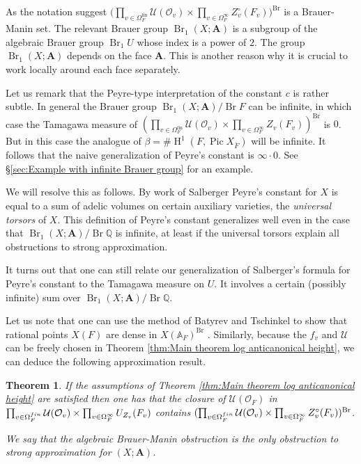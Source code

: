 \documentclass[a4paper,11pt,reqno]{amsart}
\newcommand{\Q}{\mathbb{Q}}
\newcommand{\A}{\mathbb{A}}
\DeclareMathOperator{\Pic}{Pic}
\DeclareMathOperator{\Br}{Br}
\DeclareMathOperator{\HH}{H}
\newtheorem{theorem}{Theorem}[section]
\theoremstyle{definition}
\begin{document}
As the notation suggest $\big(\prod_{v \in \Omega_F^{\text{fin}}} \mathcal{U}(\mathcal{O}_v) \times \prod_{v \in \Omega_F^{\infty}} Z_v^{\circ}(F_v)\big)^{\Br}$ is a Brauer-Manin set. The relevant Brauer group $\Br_1 (X ; \mathbf{A})$ is a subgroup of the algebraic Brauer group $\Br_1 U$ whose index is a power of $2$. The group $\Br_1 (X ; \mathbf{A})$ depends on the face $\mathbf{A}$. This is another reason why it is crucial to work locally around each face separately. 

Let us remark that the Peyre-type interpretation of the constant $c$ is rather subtle. In general the Brauer group $\Br_1 (X ; \mathbf{A})/ \Br F$ can be infinite, in which case the Tamagawa measure of $(\prod_{v \in \Omega_F^{\text{fin}}} \mathcal{U}(\mathcal{O}_v) \times \prod_{v \in \Omega_F^{\infty}} Z_v(F_v))^{\Br}$ is $0$. But in this case the analogue of $\beta = \# \HH^1(F, \Pic X_{\overline{F}})$ will be infinite. It follows that the naive generalization of Peyre's constant is $\infty \cdot 0$. See \S\ref{sec:Example with infinite Brauer group} for an example.

We will resolve this as follows. By work of Salberger \cite[Assertion~5.25]{Salberger1998Tamagawa} Peyre's constant for $X$ is equal to a sum of adelic volumes on certain auxiliary varieties, the \emph{universal torsors} of $X$. This definition of Peyre's constant generalizes well even in the case that $\Br_1 (X ; \mathbf{A})/\Br \Q$ is infinite, at least if the universal torsors explain all obstructions to strong approximation.

It turns out that one can still relate our generalization of Salberger's formula for Peyre's constant to the Tamagawa measure on $U$. It involves a certain (possibly infinite) sum over $\Br_1 (X ; \mathbf{A})/\Br \Q$.

Let us note that one can use the method of Batyrev and Tschinkel to show that rational points $X(F)$ are dense in $X(\A_F)^{\Br}$ \cite[Cor.~3.10.4]{Chambert-Loir2010Integral}. Similarly, because the $f_v$ and $\mathcal{U}$ can be freely chosen in Theorem \ref{thm:Main theorem log anticanonical height}, we can deduce the following approximation result.
\begin{theorem}\label{thm:Strong approximation in introduction}
	If the assumptions of Theorem \ref{thm:Main theorem log anticanonical height} are satisfied then one has that the closure of $\mathcal{U}(\mathcal{O}_{F})$ in $\prod_{v \in \Omega_F^{\emph{fin}}} \mathcal{U}(\mathcal{O}_v) \times \prod_{v \in \Omega_F^{\infty}} U_{Z_v}(F_v)$ contains $(\prod_{v \in \Omega_F^{\emph{fin}}} \mathcal{U}(\mathcal{O}_v) \times \prod_{v \in \Omega_F^{\infty}} Z_v^{\circ}(F_v))^{\Br}$.
	
	We say that the algebraic Brauer-Manin obstruction is the only obstruction to strong approximation for $(X ; \mathbf{A})$.
\end{theorem}
\end{document}
